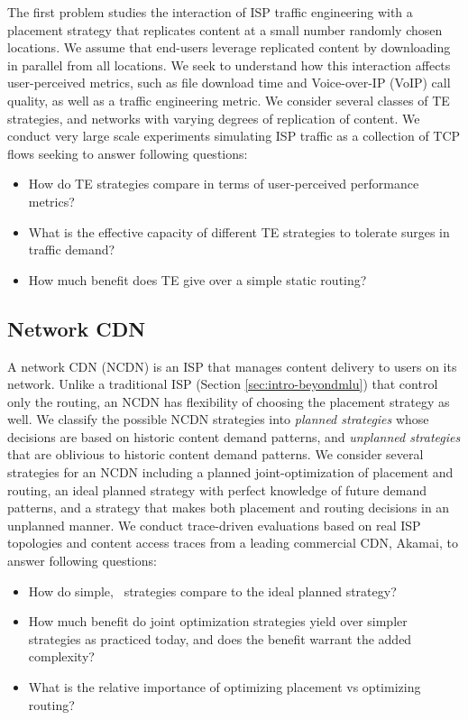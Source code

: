 The first problem studies the interaction of ISP traffic engineering with a placement strategy that replicates content at a small number randomly chosen locations. We assume that end-users leverage replicated content by downloading in parallel from all locations.
We seek to understand how this interaction affects user-perceived metrics, such as file download time and Voice-over-IP (VoIP) call quality,  as well as a traffic engineering metric. 
We consider several classes of TE strategies, and networks with varying degrees of replication of content.
We conduct very large scale experiments simulating ISP traffic as a collection of TCP flows seeking to answer following questions:
\begin{itemize}
\item
How do TE strategies compare in terms of user-perceived performance metrics?
\item
What is the effective capacity of different TE strategies to tolerate surges in traffic demand?
\item
How much benefit does TE give over a simple static routing?
\end{itemize}

\subsection{Network CDN}
\label{sec:intro-ncdn}
A network CDN (NCDN) is an ISP that manages content delivery to users on its network. 
Unlike a traditional ISP (Section \ref{sec:intro-beyondmlu}) that control only the routing, an NCDN has flexibility of choosing the placement strategy as well.
We classify the possible NCDN strategies into \emph{planned strategies} whose decisions are based on historic content  demand patterns, and \emph{unplanned strategies} that are oblivious to historic content demand patterns.
We consider several strategies for an NCDN including a planned joint-optimization of placement and routing, an ideal planned strategy with perfect knowledge of future demand patterns, and a strategy that makes both placement and routing decisions in an unplanned manner.
We conduct trace-driven evaluations based on real ISP topologies and content access traces  from a leading commercial CDN, Akamai, to answer following questions:
\begin{itemize}
\item
How do simple, \unplanned\ strategies compare to the ideal planned strategy?
\item
How much benefit do joint optimization strategies yield over simpler strategies as practiced today, and does the benefit warrant the added complexity?  
\item
What is the relative importance of optimizing placement vs optimizing routing?
\end{itemize}



